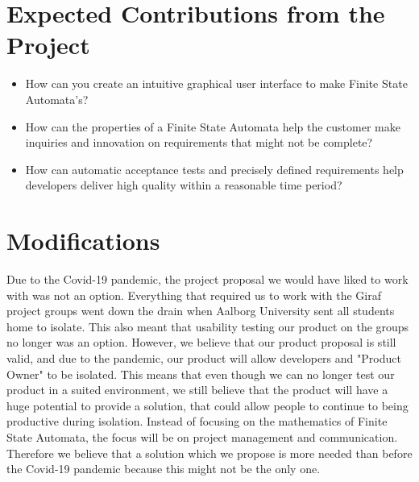 \section{Expected Contributions from the Project}
\begin{itemize}
    \item How can you create an intuitive graphical user interface to make Finite State Automata's?
    \item How can the properties of a Finite State Automata help the customer make inquiries and innovation on requirements that might not be complete?
    \item How can automatic acceptance tests and precisely defined requirements help developers deliver high quality within a reasonable time period?
\end{itemize}

\section{Modifications}
Due to the Covid-19 pandemic, the project proposal we would have liked to work with was not an option.
Everything that required us to work with the Giraf project groups went down the drain when Aalborg University sent all students home to isolate.
This also meant that usability testing our product on the groups no longer was an option. 
However, we believe that our product proposal is still valid, and due to the pandemic, our product will allow developers and "Product Owner" to be isolated.
This means that even though we can no longer test our product in a suited environment, we still believe that the product will have a huge potential to provide a solution, that could allow people to continue to being productive during isolation.
Instead of focusing on the mathematics of Finite State Automata, the focus will be on project management and communication.
Therefore we believe that a solution which we propose is more needed than before the Covid-19 pandemic because this might not be the only one.
